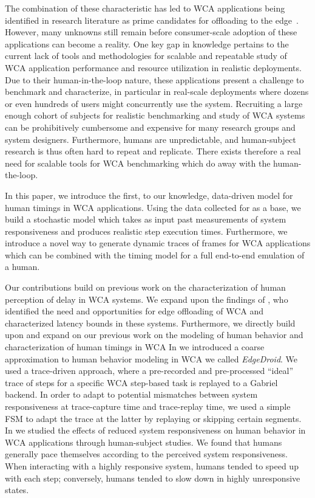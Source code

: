 The combination of these characteristic has led to \ac{WCA} applications being identified in research literature as prime candidates for offloading to the edge~\cite{Ha2014towards,Chen2017Empirical,Chen2018application}.
However, many unknowns still remain before consumer-scale adoption of these applications can become a reality.
One key gap in knowledge pertains to the current lack of tools and methodologies for scalable and repeatable study of \ac{WCA} application performance and resource utilization in realistic deployments.
Due to their human-in-the-loop nature, these applications present a challenge to benchmark and characterize, in particular in real-scale deployments where dozens or even hundreds of users might concurrently use the system.
Recruiting a large enough cohort of subjects for realistic benchmarking and study of \ac{WCA} systems can be prohibitively cumbersome and expensive for many research groups and system designers.
Furthermore, humans are unpredictable, and human-subject research is thus often hard to repeat and replicate.
There exists therefore a real need for scalable tools for \ac{WCA} benchmarking which do away with the human-the-loop.

In this paper, we introduce the first, to our knowledge, data-driven model for human timings in \ac{WCA} applications.
Using the data collected for \textcite{olguinmunoz:impact2021} as a base, we build a stochastic model which takes as input past measurements of system responsiveness and produces realistic step execution times.
Furthermore, we introduce a novel way to generate dynamic traces of frames for \ac{WCA} applications which can be combined with the timing model for a full end-to-end emulation of a human.

Our contributions build on previous work on the characterization of human perception of delay in \ac{WCA} systems.
We expand upon the findings of \textcite{Ha2014towards,Chen2017Empirical}, who identified the need and opportunities for edge offloading of \ac{WCA} and characterized latency bounds in these systems.
Furthermore, we directly build upon and expand on our previous work on the modeling of human behavior and characterization of human timings in \ac{WCA}
In \textcite{olguin2018scaling,olguin2019edgedroid} we introduced a coarse approximation to human behavior modeling in \ac{WCA} we called \emph{EdgeDroid}.
We used a trace-driven approach, where a pre-recorded and pre-processed ``ideal'' trace of steps for a specific \ac{WCA} step-based task is replayed to a Gabriel~\cite{Chen2018application} backend.
In order to adapt to potential mismatches between system responsiveness at trace-capture time and trace-replay time, we used a simple \ac{FSM} to adapt the trace at the latter by replaying or skipping certain segments.
In \textcite{olguinmunoz:impact2021} we studied the effects of reduced system responsiveness on human behavior in \ac{WCA} applications through human-subject studies.
We found that humans generally pace themselves according to the perceived system responsiveness.
When interacting with a highly responsive system, humans tended to speed up with each step; conversely, humans tended to slow down in highly unresponsive states.

